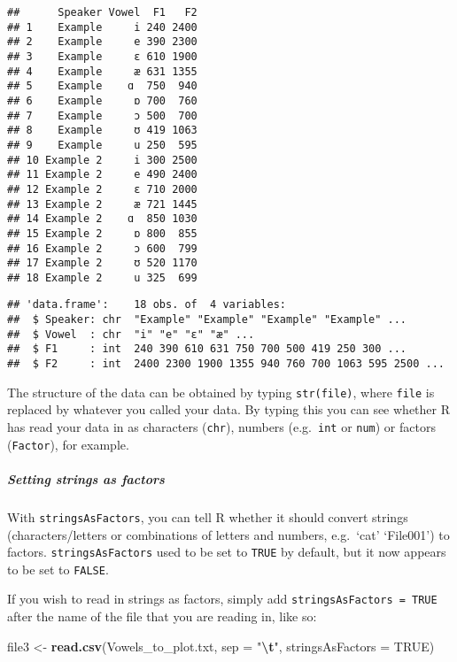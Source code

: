 \documentclass[
]{article}
\newenvironment{Shaded}{\begin{snugshade}}{\end{snugshade}}
\newcommand{\AttributeTok}[1]{\textcolor[rgb]{0.13,0.29,0.53}{#1}}
\newcommand{\ConstantTok}[1]{\textcolor[rgb]{0.56,0.35,0.01}{#1}}
\newcommand{\FunctionTok}[1]{\textcolor[rgb]{0.13,0.29,0.53}{\textbf{#1}}}
\newcommand{\NormalTok}[1]{#1}
\newcommand{\OtherTok}[1]{\textcolor[rgb]{0.56,0.35,0.01}{#1}}
\newcommand{\SpecialCharTok}[1]{\textcolor[rgb]{0.81,0.36,0.00}{\textbf{#1}}}
\newcommand{\StringTok}[1]{\textcolor[rgb]{0.31,0.60,0.02}{#1}}
\begin{document}
\begin{verbatim}
##      Speaker Vowel  F1   F2
## 1    Example     i 240 2400
## 2    Example     e 390 2300
## 3    Example     ɛ 610 1900
## 4    Example     æ 631 1355
## 5    Example    ɑ  750  940
## 6    Example     ɒ 700  760
## 7    Example     ɔ 500  700
## 8    Example     ʊ 419 1063
## 9    Example     u 250  595
## 10 Example 2     i 300 2500
## 11 Example 2     e 490 2400
## 12 Example 2     ɛ 710 2000
## 13 Example 2     æ 721 1445
## 14 Example 2    ɑ  850 1030
## 15 Example 2     ɒ 800  855
## 16 Example 2     ɔ 600  799
## 17 Example 2     ʊ 520 1170
## 18 Example 2     u 325  699
\end{verbatim}

\begin{verbatim}
## 'data.frame':    18 obs. of  4 variables:
##  $ Speaker: chr  "Example" "Example" "Example" "Example" ...
##  $ Vowel  : chr  "i" "e" "ɛ" "æ" ...
##  $ F1     : int  240 390 610 631 750 700 500 419 250 300 ...
##  $ F2     : int  2400 2300 1900 1355 940 760 700 1063 595 2500 ...
\end{verbatim}

The structure of the data can be obtained by typing \texttt{str(file)},
where \texttt{file} is replaced by whatever you called your data. By
typing this you can see whether R has read your data in as characters
(\texttt{chr}), numbers (e.g.~\texttt{int} or \texttt{num}) or factors
(\texttt{Factor}), for example.

\hypertarget{setting-strings-as-factors}{%
\subparagraph{Setting strings as
factors}\label{setting-strings-as-factors}}

With \texttt{stringsAsFactors}, you can tell R whether it should convert
strings (characters/letters or combinations of letters and numbers,
e.g.~`cat' `File001') to factors. \texttt{stringsAsFactors} used to be
set to \texttt{TRUE} by default, but it now appears to be set to
\texttt{FALSE}.

If you wish to read in strings as factors, simply add
\texttt{stringsAsFactors\ =\ TRUE} after the name of the file that you
are reading in, like so:

\begin{Shaded}
\begin{Highlighting}[]
\NormalTok{file3 }\OtherTok{\textless{}{-}} \FunctionTok{read.csv}\NormalTok{(}\StringTok{\textquotesingle{}Vowels\_to\_plot.txt\textquotesingle{}}\NormalTok{, }\AttributeTok{sep =} \StringTok{"}\SpecialCharTok{\textbackslash{}t}\StringTok{"}\NormalTok{, }\AttributeTok{stringsAsFactors =} \ConstantTok{TRUE}\NormalTok{)}
\end{Highlighting}
\end{Shaded}
\end{document}
